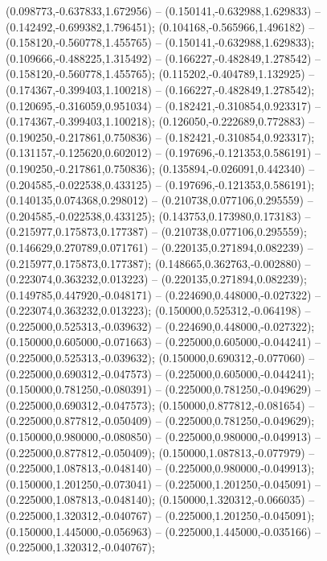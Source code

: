  (0.098773,-0.637833,1.672956) -- (0.150141,-0.632988,1.629833) -- (0.142492,-0.699382,1.796451);
 (0.104168,-0.565966,1.496182) -- (0.158120,-0.560778,1.455765) -- (0.150141,-0.632988,1.629833);
 (0.109666,-0.488225,1.315492) -- (0.166227,-0.482849,1.278542) -- (0.158120,-0.560778,1.455765);
 (0.115202,-0.404789,1.132925) -- (0.174367,-0.399403,1.100218) -- (0.166227,-0.482849,1.278542);
 (0.120695,-0.316059,0.951034) -- (0.182421,-0.310854,0.923317) -- (0.174367,-0.399403,1.100218);
 (0.126050,-0.222689,0.772883) -- (0.190250,-0.217861,0.750836) -- (0.182421,-0.310854,0.923317);
 (0.131157,-0.125620,0.602012) -- (0.197696,-0.121353,0.586191) -- (0.190250,-0.217861,0.750836);
 (0.135894,-0.026091,0.442340) -- (0.204585,-0.022538,0.433125) -- (0.197696,-0.121353,0.586191);
 (0.140135,0.074368,0.298012) -- (0.210738,0.077106,0.295559) -- (0.204585,-0.022538,0.433125);
 (0.143753,0.173980,0.173183) -- (0.215977,0.175873,0.177387) -- (0.210738,0.077106,0.295559);
 (0.146629,0.270789,0.071761) -- (0.220135,0.271894,0.082239) -- (0.215977,0.175873,0.177387);
 (0.148665,0.362763,-0.002880) -- (0.223074,0.363232,0.013223) -- (0.220135,0.271894,0.082239);
 (0.149785,0.447920,-0.048171) -- (0.224690,0.448000,-0.027322) -- (0.223074,0.363232,0.013223);
 (0.150000,0.525312,-0.064198) -- (0.225000,0.525313,-0.039632) -- (0.224690,0.448000,-0.027322);
 (0.150000,0.605000,-0.071663) -- (0.225000,0.605000,-0.044241) -- (0.225000,0.525313,-0.039632);
 (0.150000,0.690312,-0.077060) -- (0.225000,0.690312,-0.047573) -- (0.225000,0.605000,-0.044241);
 (0.150000,0.781250,-0.080391) -- (0.225000,0.781250,-0.049629) -- (0.225000,0.690312,-0.047573);
 (0.150000,0.877812,-0.081654) -- (0.225000,0.877812,-0.050409) -- (0.225000,0.781250,-0.049629);
 (0.150000,0.980000,-0.080850) -- (0.225000,0.980000,-0.049913) -- (0.225000,0.877812,-0.050409);
 (0.150000,1.087813,-0.077979) -- (0.225000,1.087813,-0.048140) -- (0.225000,0.980000,-0.049913);
 (0.150000,1.201250,-0.073041) -- (0.225000,1.201250,-0.045091) -- (0.225000,1.087813,-0.048140);
 (0.150000,1.320312,-0.066035) -- (0.225000,1.320312,-0.040767) -- (0.225000,1.201250,-0.045091);
 (0.150000,1.445000,-0.056963) -- (0.225000,1.445000,-0.035166) -- (0.225000,1.320312,-0.040767);
